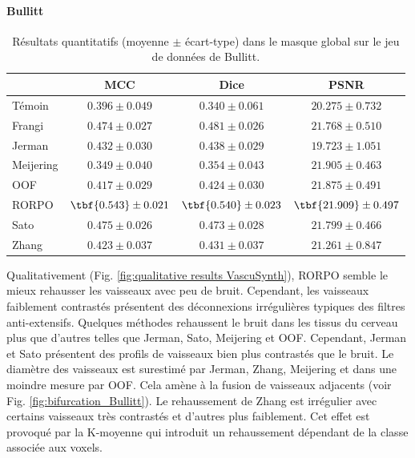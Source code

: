 \paragraph{Bullitt}

\begin{table}[!ht]
  \begin{center}
      \caption{Résultats quantitatifs (moyenne $\pm$ écart-type) dans le masque global \maskglobal sur le jeu de données de Bullitt.}
      \label{tab:quantitative results Bullit}
  \begin{tabular}{lccc}
      \hline
          & MCC & Dice & PSNR \\ 
      \hline
      Témoin	  & $ 0.396 \pm 0.049 $ & $ 0.340 \pm 0.061 $ & $ 20.275 \pm	0.732 $ \\ 
      Frangi	    & $ 0.474 \pm 0.027 $ & $ 0.481 \pm 0.026 $ & $ 21.768 \pm	0.510 $ \\ 
      Jerman	    & $ 0.432 \pm 0.030 $ & $ 0.438 \pm 0.029 $ & $ 19.723 \pm	1.051 $ \\ 
      Meijering	  & $ 0.349 \pm 0.040 $ & $ 0.354 \pm 0.043 $ & $ 21.905 \pm	0.463 $ \\ 
      OOF	        & $ 0.417 \pm 0.029 $ & $ 0.424 \pm 0.030 $ & $ 21.875 \pm	0.491 $ \\ 
      RORPO	      & $ \tbf{0.543} \pm 0.021 $ & $ \tbf{0.540} \pm 0.023 $ & $ \tbf{21.909} \pm	0.497 $ \\ 
      Sato	      & $ 0.475 \pm 0.026 $ & $ 0.473 \pm 0.028 $ & $ 21.799 \pm	0.466 $ \\ 
      Zhang	      & $ 0.423 \pm 0.037 $ & $ 0.431 \pm 0.037 $ & $ 21.261 \pm	0.847 $ \\ 

      \hline
  \end{tabular} 
\end{center}
\end{table}

Qualitativement (Fig. \ref{fig:qualitative results VascuSynth}), RORPO semble le mieux rehausser les vaisseaux avec peu de bruit. Cependant, les vaisseaux faiblement contrastés présentent des déconnexions irrégulières typiques des filtres anti-extensifs. Quelques méthodes rehaussent le bruit dans les tissus du cerveau plus que d'autres telles que Jerman, Sato, Meijering et OOF. Cependant, Jerman et Sato présentent des profils de vaisseaux bien plus contrastés que le bruit. Le diamètre des vaisseaux est surestimé par Jerman, Zhang, Meijering et dans une moindre mesure par OOF. Cela amène à la fusion de vaisseaux adjacents (voir Fig. \ref{fig:bifurcation_Bullitt}). Le rehaussement de Zhang est irrégulier avec certains vaisseaux très contrastés et d'autres plus faiblement. Cet effet est provoqué par la K-moyenne qui introduit un rehaussement dépendant de la classe associée aux voxels.

